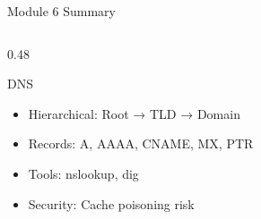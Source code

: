 \documentclass[aspectratio=169, 11pt]{beamer}
\begin{document}
\begin{frame}{Module 6 Summary}
\begin{columns}[T]
\begin{column}{0.48\textwidth}
            \vspace{0.2em}
            \begin{block}{DNS}
                \small
                \begin{itemize}\setlength{\itemsep}{1pt}
                    \item Hierarchical: Root → TLD → Domain
                    \item Records: A, AAAA, CNAME, MX, PTR
                    \item Tools: nslookup, dig
                    \item Security: Cache poisoning risk
                \end{itemize}
            \end{block}
            
        \end{column}
    \end{columns}
\end{frame}
\end{document}

